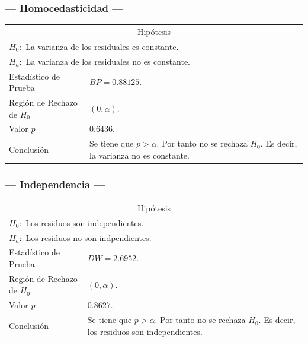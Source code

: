 \subsubsection{--- Homocedasticidad ---} %
\begin{center}
  \begin{tabular}{|l|p{8cm}|}
    \cline{1-2}
    \multicolumn{2}{|c|}{Hipótesis}\\ \cline{1-2}
    \multicolumn{2}{|l|}{\(H_0:\) La varianza de los residuales es constante.} \\ 
    \multicolumn{2}{|l|}{\(H_a:\) La varianza de los residuales no es constante.} \\ \cline{1-2}
    Estadístico de Prueba & \(BP = 0.88125\).\\ \cline{1-2} 
		Región de Rechazo de \(H_0\) & \((0, \alpha )\).\\ \cline{1-2} 
    Valor \(p\) & \(0.6436\).\\ \cline{1-2} 
    Conclusión & Se tiene que \(p> \alpha\). \newline 
		Por tanto no se rechaza \(H_0\). \newline 
		Es decir, la varianza no es constante. \\ \cline{1-2} 
  \end{tabular}
\end{center}

\subsubsection{--- Independencia ---} %
\begin{center}
  \begin{tabular}{|l|p{8cm}|}
    \cline{1-2}
    \multicolumn{2}{|c|}{Hipótesis}\\ \cline{1-2}
    \multicolumn{2}{|l|}{\(H_0:\) Los residuos son independientes.} \\ 
    \multicolumn{2}{|l|}{\(H_a:\) Los residuos no son indpendientes.} \\ \cline{1-2}
    Estadístico de Prueba & \(DW = 2.6952\).\\ \cline{1-2} 
		Región de Rechazo de \(H_0\) & \((0, \alpha )\).\\ \cline{1-2} 
    Valor \(p\) & \(0.8627\).\\ \cline{1-2} 
    Conclusión & Se tiene que \(p> \alpha\). \newline 
		Por tanto no se rechaza \(H_0\). \newline 
		Es decir, los residuos son independientes.\\ \cline{1-2} 
  \end{tabular}
\end{center}

